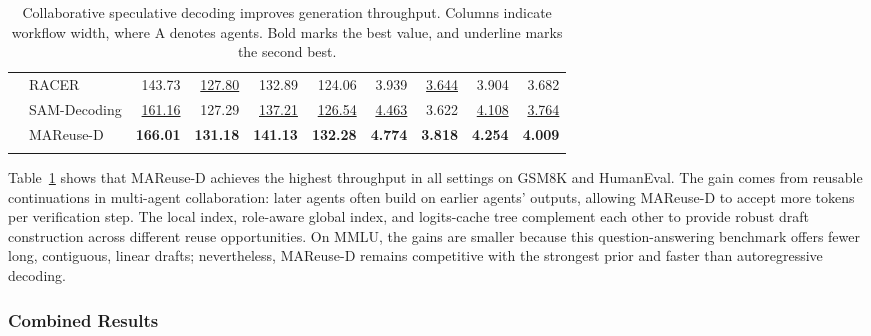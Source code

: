 \documentclass[letterpaper]{article} %
\newcommand{\thickhline}{\noalign{\hrule height 0.8pt}}
\begin{document}
\begin{table}[t]
\begin{tabular}{clrrrrrrrr}
 \addlinespace[1pt]
 & RACER & 143.73 & \underline{127.80} & 132.89 & 124.06 & 3.939 & \underline{3.644} & 3.904 & 3.682 \\
 \addlinespace[1pt]
 & SAM-Decoding & \underline{161.16} & 127.29 & \underline{137.21} & \underline{126.54} & \underline{4.463} & 3.622 & \underline{4.108} & \underline{3.764} \\
 \addlinespace[1pt]
 & MAReuse-D & \textbf{166.01} & \textbf{131.18} & \textbf{141.13} & \textbf{132.28} & \textbf{4.774} & \textbf{3.818} & \textbf{4.254} & \textbf{4.009} \\
\thickhline
\end{tabular}
\caption{Collaborative speculative decoding improves generation throughput. Columns indicate workflow width, where A denotes agents. Bold marks the best value, and underline marks the second best.}
\label{tab:decoding-results}
\end{table}

Table~\ref{tab:decoding-results} shows that MAReuse-D achieves the highest throughput in all settings on GSM8K and HumanEval. The gain comes from reusable continuations in multi-agent collaboration: later agents often build on earlier agents' outputs, allowing MAReuse-D to accept more tokens per verification step. The local index, role-aware global index, and logits-cache tree complement each other to provide robust draft construction across different reuse opportunities. On MMLU, the gains are smaller because this question-answering benchmark offers fewer long, contiguous, linear drafts; nevertheless, MAReuse-D remains competitive with the strongest prior and faster than autoregressive decoding.

\subsubsection{Combined Results}
\end{document}
